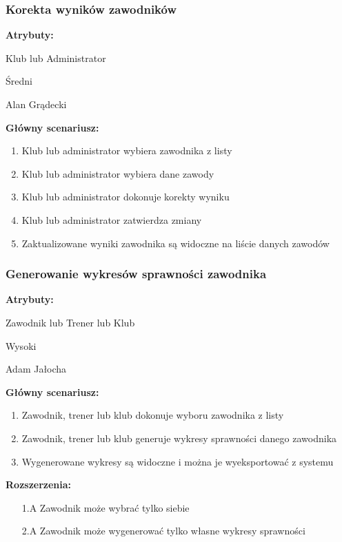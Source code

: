 \documentclass[polish, a4paper]{article}
\begin{document}
\subsubsection{Korekta wyników zawodników}
\noindent
\textbf{Atrybuty:}
\begin{description}[labelindent=0.5cm]
    \item[Główny aktor:]{Klub lub Administrator}
    \item[Priorytet:]{Średni}
    \item[Źródło:]{Alan Grądecki}
\end{description}

\noindent
\textbf{Główny scenariusz:}
\begin{enumerate}
    \item Klub lub administrator wybiera zawodnika z listy
    \item Klub lub administrator wybiera dane zawody
    \item Klub lub administrator dokonuje korekty wyniku
    \item Klub lub administrator zatwierdza zmiany
    \item Zaktualizowane wyniki zawodnika są widoczne na liście danych zawodów
\end{enumerate}

\subsubsection{Generowanie wykresów sprawności zawodnika}
\noindent
\textbf{Atrybuty:}
\begin{description}[labelindent=0.5cm]
    \item[Główny aktor:]{Zawodnik lub Trener lub Klub}
    \item[Priorytet:]{Wysoki}
    \item[Źródło:]{Adam Jałocha}
\end{description}

\noindent
\textbf{Główny scenariusz:}
\begin{enumerate}
    \item Zawodnik, trener lub klub dokonuje wyboru zawodnika z listy
    \item Zawodnik, trener lub klub generuje wykresy sprawności danego zawodnika
    \item Wygenerowane wykresy są widoczne i można je wyeksportować z systemu
\end{enumerate}
\noindent
\textbf{Rozszerzenia:}
\begin{itemize}
    \item[1.A] Zawodnik może wybrać tylko siebie
    \item[2.A] Zawodnik może wygenerować tylko własne wykresy sprawności
\end{itemize}
\end{document}
